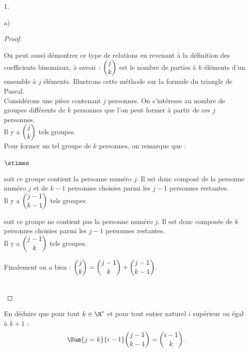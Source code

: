 \documentclass[11pt]{article}%
\begin{document}
\begin{noliste}{1.}
\begin{noliste}{a)}
\begin{proof}
      \begin{remark}
        On peut aussi démontrer ce type de relations en revenant à la
        définition des coefficients binomiaux, à savoir :
        $\dbinom{j}{k}$ est le nombre de parties à $k$ éléments d'un
        ensemble à $j$ éléments. Illustrons cette
        méthode sur la formule du triangle de Pascal.\\[.2cm]
        Considérons une pièce contenant $j$ personnes. On s'intéresse
        au nombre de groupes différents de $k$ personnes
        que l'on peut former à partir de ces $j$ personnes.\\
        Il y a $\dbinom{j}{k}$ tels groupes.\\
        Pour former un tel groupe de $k$ personnes, on remarque que :
        \begin{noliste}{$\stimes$}
        \item soit ce groupe contient la personne numéro $j$. Il est
          donc composé de la personne numéro $j$ et de $k-1$ personnes
          choisies parmi les $j-1$ personnes restantes.\\[.1cm]
          Il y a $\dbinom{j-1}{k-1}$ tels groupes.
        \item soit ce groupe ne contient pas la personne numéro
          $j$. Il est donc composée de $k$ personnes choisies parmi
          les $j-1$ personnes restantes.\\[.1cm]
          Il y a $\dbinom{j-1}{k}$ tels groupes.
        \end{noliste}
        Finalement on a bien : $\dbinom{j}{k}=
        \dbinom{j-1}{k}+\dbinom{j-1}{k-1}$.      
      \end{remark}~\\[-1.4cm]
    \end{proof}

	
  \item En déduire que pour tout $k\in\N^*$ et pour tout entier
    naturel $i$ supérieur ou égal à $k+1$ :
    \[
    \Sum{j=k}{i-1} \dbinom{j-1}{k-1} = \dbinom{i-1}{k}.
    \]
    

\end{noliste}
\end{noliste}
\end{document}
